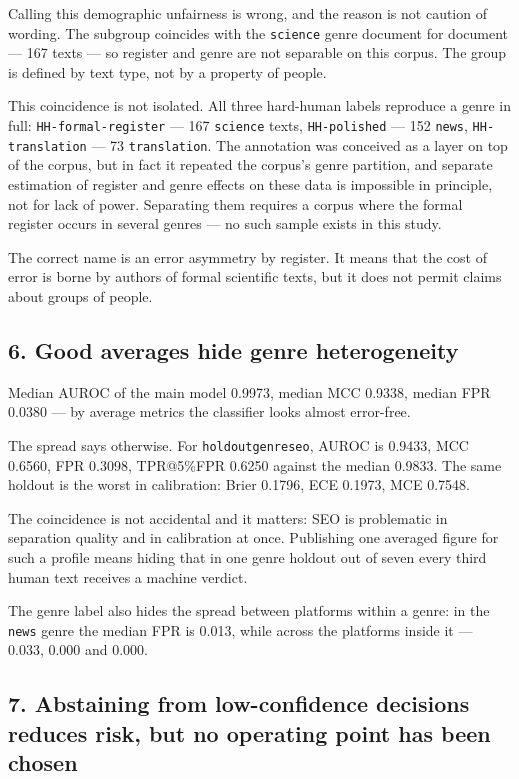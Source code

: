 \documentclass[11pt,a4paper]{article}
\renewcommand{\_}{\textunderscore\allowbreak}
\begin{document}
Calling this demographic unfairness is wrong, and the reason is not caution of
wording. The subgroup coincides with the \texttt{science} genre document for document —
167 texts — so register and genre are not separable on this corpus. The group is
defined by text type, not by a property of people.

This coincidence is not isolated. All three hard-human labels reproduce a genre
in full: \texttt{HH-\allowbreak{}formal-\allowbreak{}register} — 167 \texttt{science} texts, \texttt{HH-\allowbreak{}polished} — 152 \texttt{news},
\texttt{HH-\allowbreak{}translation} — 73 \texttt{translation}. The annotation was conceived as a layer on
top of the corpus, but in fact it repeated the corpus's genre partition, and
separate estimation of register and genre effects on these data is impossible in
principle, not for lack of power. Separating them requires a corpus where the
formal register occurs in several genres — no such sample exists in this study.

The correct name is an error asymmetry by register. It means that the cost of
error is borne by authors of formal scientific texts, but it does not permit
claims about groups of people.

\subsection{6. Good averages hide genre heterogeneity}

Median AUROC of the main model 0.9973, median MCC 0.9338, median FPR 0.0380 — by
average metrics the classifier looks almost error-free.

The spread says otherwise. For \texttt{holdout\_genre\_seo}, AUROC is 0.9433, MCC 0.6560,
FPR 0.3098, TPR@5\%FPR 0.6250 against the median 0.9833. The same holdout is the
worst in calibration: Brier 0.1796, ECE 0.1973, MCE 0.7548.

The coincidence is not accidental and it matters: SEO is problematic in
separation quality and in calibration at once. Publishing one averaged figure for
such a profile means hiding that in one genre holdout out of seven every third
human text receives a machine verdict.

The genre label also hides the spread between platforms within a genre: in the
\texttt{news} genre the median FPR is 0.013, while across the platforms
inside it — 0.033, 0.000 and 0.000.

\subsection{7. Abstaining from low-confidence decisions reduces risk, but no operating point has been chosen}
\end{document}
